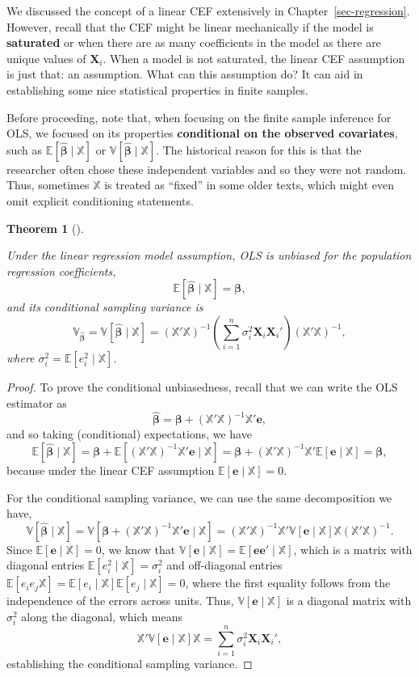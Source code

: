 \documentclass[
  13pt,
  letterpaper,
  DIV=11,
  numbers=noendperiod]{scrreprt}
\newcommand{\mb}{\symbf}
\newcommand{\E}{\mathbb{E}}
\newcommand{\V}{\mathbb{V}}
\newcommand{\X}{\mb{X}}
\newcommand{\Xmat}{\mathbb{X}}
\newcommand{\bfbeta}{\mb{\beta}}
\newcommand{\bhat}{\widehat{\mb{\beta}}}
\theoremstyle{plain}
\newtheorem{theorem}{Theorem}[chapter]
\theoremstyle{definition}
\theoremstyle{definition}
\theoremstyle{remark}
\begin{document}
We discussed the concept of a linear CEF extensively in
Chapter~\ref{sec-regression}. However, recall that the CEF might be
linear mechanically if the model is \textbf{saturated} or when there are
as many coefficients in the model as there are unique values of
\(\X_i\). When a model is not saturated, the linear CEF assumption is
just that: an assumption. What can this assumption do? It can aid in
establishing some nice statistical properties in finite samples.

Before proceeding, note that, when focusing on the finite sample
inference for OLS, we focused on its properties \textbf{conditional on
the observed covariates}, such as \(\E[\bhat \mid \Xmat]\) or
\(\V[\bhat \mid \Xmat]\). The historical reason for this is that the
researcher often chose these independent variables and so they were not
random. Thus, sometimes \(\Xmat\) is treated as ``fixed'' in some older
texts, which might even omit explicit conditioning statements.

\begin{theorem}[]\protect\hypertarget{thm-ols-unbiased}{}\label{thm-ols-unbiased}

Under the linear regression model assumption, OLS is unbiased for the
population regression coefficients, \[
\E[\bhat \mid \Xmat] = \bfbeta,
\] and its conditional sampling variance is \[
\mb{\V}_{\bhat} = \V[\bhat \mid \Xmat] = \left( \Xmat'\Xmat \right)^{-1}\left( \sum_{i=1}^n \sigma^2_i \X_i\X_i' \right) \left( \Xmat'\Xmat \right)^{-1},
\] where \(\sigma^2_{i} = \E[e_{i}^{2} \mid \Xmat]\).

\end{theorem}

\begin{proof}
To prove the conditional unbiasedness, recall that we can write the OLS
estimator as \[
\bhat = \bfbeta + (\Xmat'\Xmat)^{-1}\Xmat'\mb{e},
\] and so taking (conditional) expectations, we have \[
\E[\bhat \mid \Xmat] = \bfbeta + \E[(\Xmat'\Xmat)^{-1}\Xmat'\mb{e} \mid \Xmat] = \bfbeta + (\Xmat'\Xmat)^{-1}\Xmat'\E[\mb{e} \mid \Xmat] = \bfbeta,
\] because under the linear CEF assumption \(\E[\mb{e}\mid \Xmat] = 0\).

For the conditional sampling variance, we can use the same decomposition
we have, \[
\V[\bhat \mid \Xmat] = \V[\bfbeta + (\Xmat'\Xmat)^{-1}\Xmat'\mb{e} \mid \Xmat] = (\Xmat'\Xmat)^{-1}\Xmat'\V[\mb{e} \mid \Xmat]\Xmat(\Xmat'\Xmat)^{-1}. 
\] Since \(\E[\mb{e}\mid \Xmat] = 0\), we know that
\(\V[\mb{e}\mid \Xmat] = \E[\mb{ee}' \mid \Xmat]\), which is a matrix
with diagonal entries \(\E[e_{i}^{2} \mid \Xmat] = \sigma^2_i\) and
off-diagonal entries
\(\E[e_{i}e_{j} \Xmat] = \E[e_{i}\mid \Xmat]\E[e_{j}\mid\Xmat] = 0\),
where the first equality follows from the independence of the errors
across units. Thus, \(\V[\mb{e} \mid \Xmat]\) is a diagonal matrix with
\(\sigma^2_i\) along the diagonal, which means \[
\Xmat'\V[\mb{e} \mid \Xmat]\Xmat = \sum_{i=1}^n \sigma^2_i \X_i\X_i',
\] establishing the conditional sampling variance.
\end{proof}
\end{document}

